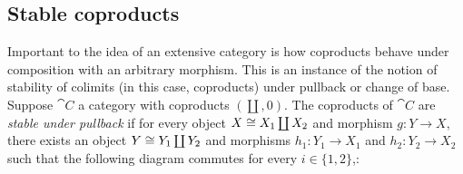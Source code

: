 \subsection{Stable coproducts}
\label{sec:stable-coproducts}

Important to the idea of an extensive category is how coproducts behave under composition with an arbitrary
morphism. This is an instance of the notion of stability of colimits (in this case, coproducts) under pullback
or change of base. Suppose $\cat{C}$ a category with coproducts $(\coprod, 0)$. The coproducts of $\cat{C}$
are \emph{stable under pullback} if for every object $X \cong X_1 \coprod X_2$ and morphism $g: Y \to X$, there
exists an object $Y \cong Y_1 \coprod Y_2$ and morphisms $h_1: Y_1 \to X_1$ and $h_2: Y_2 \to X_2$ such that
the following diagram commutes for every $i \in \{1, 2\}$,:

\begin{center}
\end{center}

